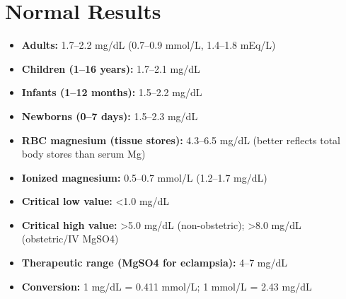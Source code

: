 \section*{Normal Results}
\begin{itemize}
  \item \textbf{Adults:} 1.7--2.2 mg/dL (0.7--0.9 mmol/L, 1.4--1.8 mEq/L)
  \item \textbf{Children (1--16 years):} 1.7--2.1 mg/dL
  \item \textbf{Infants (1--12 months):} 1.5--2.2 mg/dL
  \item \textbf{Newborns (0--7 days):} 1.5--2.3 mg/dL
  \item \textbf{RBC magnesium (tissue stores):} 4.3--6.5 mg/dL (better reflects total body stores than serum Mg)
  \item \textbf{Ionized magnesium:} 0.5--0.7 mmol/L (1.2--1.7 mg/dL)
  \item \textbf{Critical low value:} <1.0 mg/dL
  \item \textbf{Critical high value:} >5.0 mg/dL (non-obstetric); >8.0 mg/dL (obstetric/IV MgSO4)
  \item \textbf{Therapeutic range (MgSO4 for eclampsia):} 4--7 mg/dL
  \item \textbf{Conversion:} 1 mg/dL = 0.411 mmol/L; 1 mmol/L = 2.43 mg/dL
\end{itemize}

